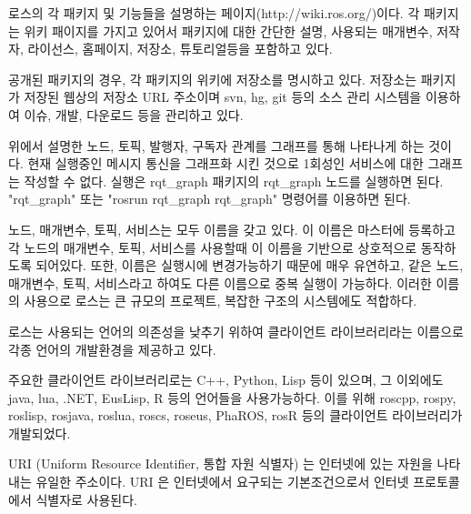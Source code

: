 \begin{definition}\label{def:RosWiki}
로스의 각 패키지 및 기능들을 설명하는 페이지(http://wiki.ros.org/)이다.  각 패키지는 위키 패이지를 가지고 있어서 패키지에 대한 간단한 설명, 사용되는 매개변수, 저작자, 라이선스, 홈페이지, 저장소, 튜토리얼등을 포함하고 있다.
\end{definition}

\begin{definition}\label{def:RosRepository}
공개된 패키지의 경우, 각 패키지의 위키에 저장소를 명시하고 있다. 저장소는 패키지가 저장된 웹상의 저장소 URL 주소이며 svn, hg, git 등의 소스 관리 시스템을 이용하여 이슈, 개발, 다운로드 등을 관리하고 있다.
\end{definition}

\begin{definition}\label{def:RosGraph}
위에서 설명한 노드, 토픽, 발행자, 구독자 관계를 그래프를 통해 나타나게 하는 것이다. 현재 실행중인 메시지 통신을 그래프화 시킨 것으로 1회성인 서비스에 대한 그래프는 작성할 수 없다. 실행은 rqt\_graph 패키지의 rqt\_graph 노드를 실행하면 된다. "rqt\_graph" 또는 "rosrun rqt\_graph rqt\_graph" 명령어를 이용하면 된다.   
\end{definition}

\begin{definition}[이름(name)]\label{def:RosName}
노드, 매개변수, 토픽, 서비스는 모두 이름을 갖고 있다. 이 이름은 마스터에 등록하고 각 노드의 매개변수, 토픽, 서비스를 사용할때 이 이름을 기반으로 상호적으로 동작하도록 되어있다. 또한, 이름은 실행시에 변경가능하기 때문에 매우 유연하고, 같은 노드, 매개변수, 토픽, 서비스라고 하여도 다른 이름으로 중복 실행이 가능하다. 이러한 이름의 사용으로 로스는 큰 규모의 프로젝트, 복잡한 구조의 시스템에도 적합하다.  
\end{definition}

\begin{definition}\label{def:RosClientLibray}
로스는 사용되는 언어의 의존성을 낮추기 위하여 클라이언트 라이브러리라는 이름으로 각종 언어의 개발환경을 제공하고 있다. 

주요한 클라이언트 라이브러리로는 C++, Python, Lisp 등이 있으며, 그 이외에도 java, lua, .NET, EusLisp, R 등의 언어들을 사용가능하다. 이를 위해 roscpp, rospy, roslisp, rosjava, roslua, roscs, roseus, PhaROS, rosR 등의 클라이언트 라이브러리가 개발되었다.
\end{definition}

\begin{definition}\label{def:RosURI}
URI (Uniform Resource Identifier, 통합 자원 식별자) 는 인터넷에 있는 자원을 나타내는 유일한 주소이다. URI 은 인터넷에서 요구되는 기본조건으로서 인터넷 프로토콜에서 식별자로 사용된다.
\end{definition}

